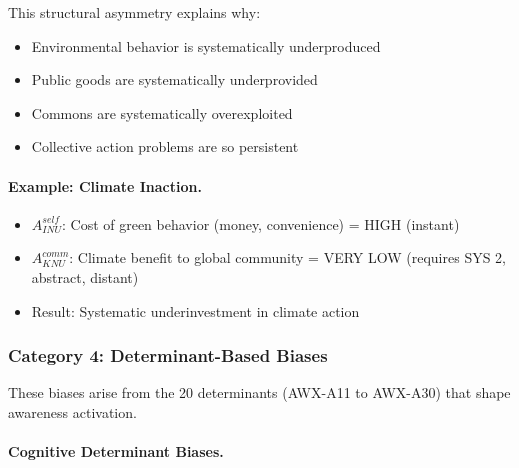 This structural asymmetry explains why:
\begin{itemize}
\item Environmental behavior is systematically underproduced
\item Public goods are systematically underprovided
\item Commons are systematically overexploited
\item Collective action problems are so persistent
\end{itemize}

\paragraph{Example: Climate Inaction.}
\begin{itemize}
\item $A^{self}_{INU}$: Cost of green behavior (money, convenience) = HIGH (instant)
\item $A^{comm}_{KNU}$: Climate benefit to global community = VERY LOW (requires SYS 2, abstract, distant)
\item Result: Systematic underinvestment in climate action
\end{itemize}

\subsubsection{Category 4: Determinant-Based Biases}

These biases arise from the 20 determinants (AWX-A11 to AWX-A30) that
shape awareness activation.

\paragraph{Cognitive Determinant Biases.}

